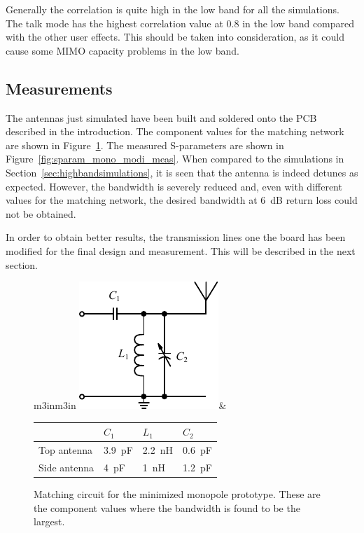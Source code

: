Generally the correlation is quite high in the low band for all the simulations. The talk mode has the highest correlation value at $0.8$ in the low band compared with the other user effects. This should be taken into consideration, as it could cause some MIMO capacity problems in the low band. 

\FloatBarrier
\subsection{Measurements}
The antennas just simulated have been built and soldered onto the PCB described in the introduction. The component values for the matching network are shown in Figure~\ref{fig:mono_matching_modi_meas}. The measured S-parameters are shown in Figure~\ref{fig:sparam_mono_modi_meas}. When compared to the simulations in Section~\ref{sec:highbandsimulations}, it is seen that the antenna is indeed detunes as expected. However, the bandwidth is severely reduced and, even with different values for the matching network, the desired bandwidth at \SI{6}{dB} return loss could not be obtained.

In order to obtain better results, the transmission lines one the board has been modified for the final design and measurement. This will be described in the next section.

\begin{figure}[htbp]
        \centering
        \begin{tabular}{m{3in}m{3in}}
            \centering
            \includegraphics{img/tech_sol/schematic_tuning_1}&
            \centering
            \footnotesize
            \begin{tabular}{|l|l|l|l|}
                \hline
                & $C_1$ & $L_1$ & $C_2$ \\
                \hline
              Top antenna & \SI{3.9}{pF} & \SI{2.2}{nH} & \SI{0.6}{pF} \\
              Side antenna & \SI{4}{pF} & \SI{1}{nH} & \SI{1.2}{pF} \\
                \hline
            \end{tabular}
        \end{tabular}
    \caption{Matching circuit for the minimized monopole prototype. These are the component values where the bandwidth is found to be the largest.}
    \label{fig:mono_matching_modi_meas}
\end{figure}

